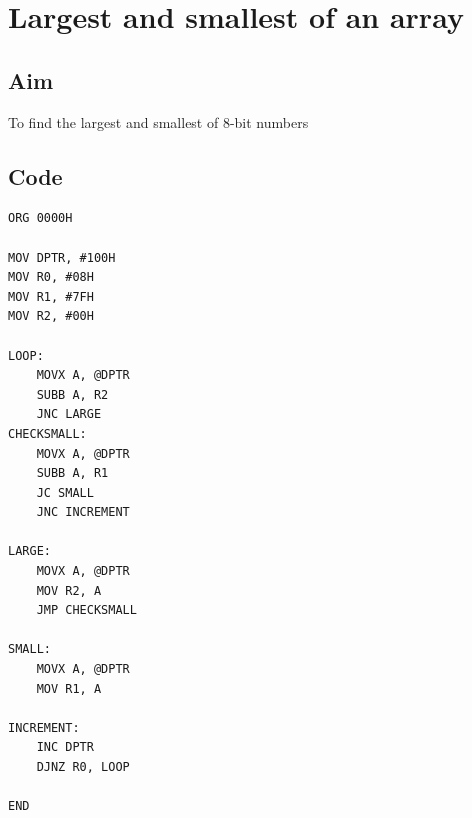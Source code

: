 \section{Largest and smallest of an array}
\subsection{Aim}
To find the largest and smallest of 8-bit numbers

\subsection{Code}
\begin{lstlisting}
ORG 0000H

MOV DPTR, #100H
MOV R0, #08H
MOV R1, #7FH
MOV R2, #00H

LOOP:
	MOVX A, @DPTR
	SUBB A, R2
	JNC LARGE
CHECKSMALL:
	MOVX A, @DPTR
	SUBB A, R1
	JC SMALL
	JNC INCREMENT
	
LARGE:
	MOVX A, @DPTR
	MOV R2, A
	JMP CHECKSMALL

SMALL:
	MOVX A, @DPTR
	MOV R1, A

INCREMENT:
	INC DPTR
	DJNZ R0, LOOP
	
END
\end{lstlisting}

